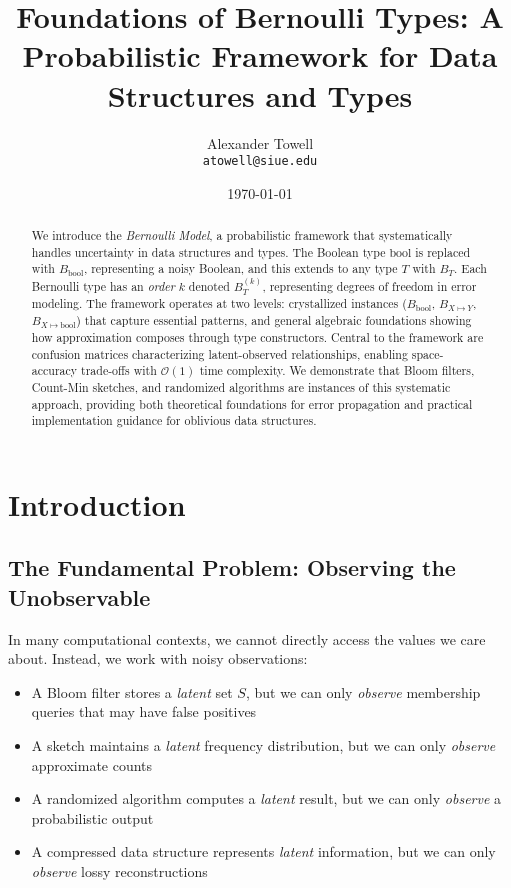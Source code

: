 \documentclass[11pt,final,hidelinks]{article}
\title{Foundations of Bernoulli Types: A Probabilistic Framework for Data Structures and Types}
\author{
    Alexander Towell\\
    \texttt{atowell@siue.edu}
}
\date{\today}
\begin{document}
\maketitle
\NotationSection

\begin{abstract}
We introduce the \emph{Bernoulli Model}, a probabilistic framework that systematically handles uncertainty in data structures and types. The Boolean type $\mathrm{bool}$ is replaced with $B_{\mathrm{bool}}$, representing a noisy Boolean, and this extends to any type $T$ with $B_T$. Each Bernoulli type has an \emph{order} $k$ denoted $B_T^{(k)}$, representing degrees of freedom in error modeling. The framework operates at two levels: crystallized instances ($B_{\mathrm{bool}}$, $B_{X \mapsto Y}$, $B_{X \mapsto \mathrm{bool}}$) that capture essential patterns, and general algebraic foundations showing how approximation composes through type constructors. Central to the framework are confusion matrices characterizing latent-observed relationships, enabling space-accuracy trade-offs with $\mathcal{O}(1)$ time complexity. We demonstrate that Bloom filters, Count-Min sketches, and randomized algorithms are instances of this systematic approach, providing both theoretical foundations for error propagation and practical implementation guidance for oblivious data structures.
\end{abstract}

\section{Introduction}

\subsection{The Fundamental Problem: Observing the Unobservable}

In many computational contexts, we cannot directly access the values we care about. Instead, we work with noisy observations:

\begin{itemize}
    \item A Bloom filter stores a \emph{latent} set $S$, but we can only \emph{observe} membership queries that may have false positives
    \item A sketch maintains a \emph{latent} frequency distribution, but we can only \emph{observe} approximate counts
    \item A randomized algorithm computes a \emph{latent} result, but we can only \emph{observe} a probabilistic output
    \item A compressed data structure represents \emph{latent} information, but we can only \emph{observe} lossy reconstructions
\end{itemize}
\end{document}
